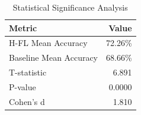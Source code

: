 \begin{table}[h]
\centering
\caption{Statistical Significance Analysis}
\begin{tabular}{|l|r|}
\hline
Metric & Value \\
\hline
H-FL Mean Accuracy & 72.26\% \\
Baseline Mean Accuracy & 68.66\% \\
T-statistic & 6.891 \\
P-value & 0.0000 \\
Cohen's d & 1.810 \\
\hline
\end{tabular}
\end{table}
